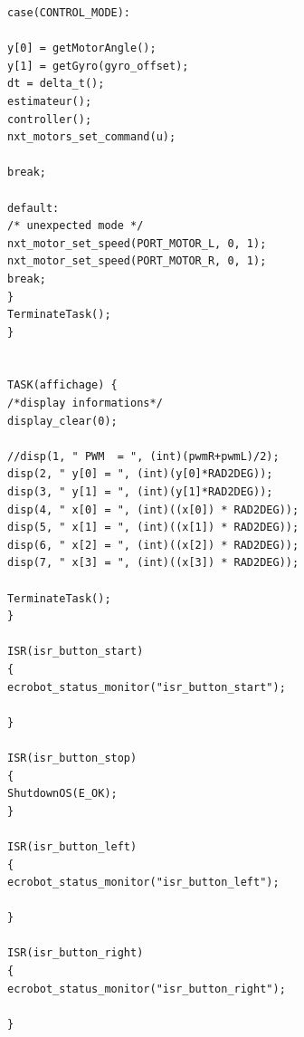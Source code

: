 \documentclass[a4paper]{article}
\begin{document}
\begin{verbatim}
case(CONTROL_MODE):

y[0] = getMotorAngle();
y[1] = getGyro(gyro_offset);
dt = delta_t();
estimateur();
controller();
nxt_motors_set_command(u);

break;

default:
/* unexpected mode */
nxt_motor_set_speed(PORT_MOTOR_L, 0, 1);
nxt_motor_set_speed(PORT_MOTOR_R, 0, 1);
break;
}
TerminateTask();
}


TASK(affichage) {
/*display informations*/
display_clear(0);

//disp(1, " PWM  = ", (int)(pwmR+pwmL)/2);
disp(2, " y[0] = ", (int)(y[0]*RAD2DEG));
disp(3, " y[1] = ", (int)(y[1]*RAD2DEG));
disp(4, " x[0] = ", (int)((x[0]) * RAD2DEG));
disp(5, " x[1] = ", (int)((x[1]) * RAD2DEG));
disp(6, " x[2] = ", (int)((x[2]) * RAD2DEG));
disp(7, " x[3] = ", (int)((x[3]) * RAD2DEG));

TerminateTask();
}

ISR(isr_button_start)
{
ecrobot_status_monitor("isr_button_start");

}

ISR(isr_button_stop)
{
ShutdownOS(E_OK);
}

ISR(isr_button_left)
{
ecrobot_status_monitor("isr_button_left"); 

}

ISR(isr_button_right)
{
ecrobot_status_monitor("isr_button_right");   

}

        \end{verbatim}
\end{document}
